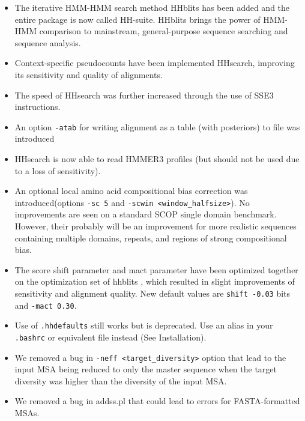 \documentclass[11pt,a4paper]{article}
\begin{document}
\begin{itemize}

\item The iterative HMM-HMM search method HHblits has been added and the entire package is now called HH-suite. HHblits brings the power of HMM-HMM comparison to mainstream, general-purpose sequence searching and sequence analysis. 

\item Context-specific pseudocounts have been implemented HHsearch, improving its sensitivity and quality of alignments.

\item The speed of HHsearch was further increased through the use of SSE3 instructions.

\item An option \verb`-atab` for writing alignment as a table (with posteriors) to file was introduced

\item HHsearch is now able to read HMMER3 profiles (but should not be used due to a loss of sensitivity).

\item An optional local amino acid compositional bias correction was introduced(options \verb`-sc 5` and \verb`-scwin <window_halfsize>`). No improvements are seen on a standard SCOP single domain benchmark. However, their probably will be an improvement for more realistic sequences containing multiple domains, repeats, and regions of strong compositional bias. 

\item The score shift parameter and mact parameter have been optimized together on the optimization set of hhblits \cite{Remmert:2011}, which resulted in slight improvements of sensitivity and alignment quality. New default values are  \verb`shift -0.03` bits and \verb`-mact 0.30`. 

\item Use of \verb`.hhdefaults` still works but is deprecated. Use an alias in 
your \verb`.bashrc` or equivalent file instead (See Installation).

\item We removed a bug in \verb`-neff <target_diversity>` option that lead to the input MSA being reduced to only the master sequence when the target diversity was higher than the diversity of the input MSA.

\item We removed a bug in addss.pl that could lead to errors for FASTA-formatted MSAs.

\end{itemize}
\end{document}
